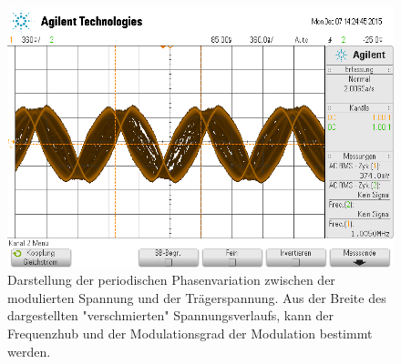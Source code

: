 \FloatBarrier
\begin{figure}[!h]
	\centering
	\includegraphics[scale=0.50]{../Grafiken/Messung_d2.png}
	\caption{Darstellung der periodischen Phasenvariation zwischen der modulierten Spannung und der
	Trägerspannung. Aus der Breite des dargestellten "verschmierten" Spannungsverlaufs, kann der Frequenzhub
	und der Modulationsgrad der Modulation bestimmt werden. \label{fig:frequenz_modulation_d_phasenvariation}}
\end{figure}
\FloatBarrier